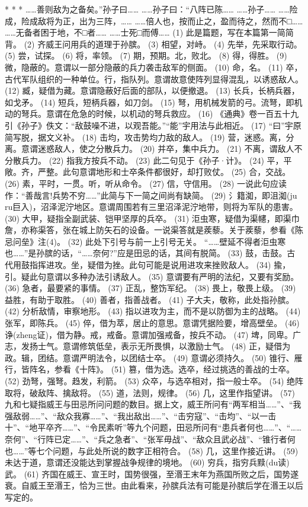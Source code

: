 \documentclass[12pt,UTF8]{ctexbook}
\begin{document}
* * *
……善则敌为之备矣。”孙子曰……
……孙子曰：“八阵已陈……
……孙子……
……险成，险成敌将为正，出为三阵，……
……倍人也，按而止之，盈而待之，然而不□……
……无备者困于地，不□者……
……士死□而傅……
(1) 此是篇题，写在本篇第一简简背。
(2) 齐威王问用兵的道理于孙膑。
(3) 相望，对峙。
(4) 先举，先采取行动。
(5) 尝，试探。
(6) 将，率领。
(7) 期，预期。北，败北。
(8) 得，得胜。
(9) 微，隐蔽的。意谓以一部分隐蔽的兵力袭击敌军的侧面。
(10) 命，名。
(11) 卒，古代军队组织的一种单位。行，指队列。意谓故意使阵列显得混乱，以诱惑敌人。
(12) 臧，疑借为藏。意谓隐蔽好后面的部队，以便撤退。
(13) 长兵，长柄兵器，如戈矛。
(14) 短兵，短柄兵器，如刀剑。
(15) 弩，用机械发箭的弓。流弩，即机动的弩兵。意谓在危急的时候，以机动的弩兵救应。
(16) 《通典》卷一百五十九引《孙子》佚文：“敌鼓噪不进，以观吾能。”“能”宇用法与此相近。
(17) “曰”宇原简写脱，据文义补。
(18) 击均，攻击势均力敌的敌人。
(19) 营，迷惑。离，分离。意谓迷惑敌人，使之分散兵力。
(20) 并卒，集中兵力。
(21) 不离，谓敌人不分散兵力。
(22) 指我方按兵不动。
(23) 此二句见于《孙子·计》。
(24) 平，平敞。齐，严整。此句意谓地形和士卒条件都很好，却打败仗。
(25) 合，交战。
(26) 素，平时，一贯。听，听从命令。
(27) 信，守信用。
(28) 一说此句应读作：“善哉言!兵势不穷……”此简与下一简之间尚有缺简。
(29) {氵籍}洳，即沮洳(ju ru巨入)，沼泽泥泞地区。意谓周围若有三里沼泽泥泞地带，则将为军队的患害。
(30) 大甲，疑指全副武装、铠甲坚厚的兵卒。
(31) {洰虫}寒，疑借为渠幰，即渠{巾詹}，亦称渠答，张在城上防矢石的设备。一说渠答就是蒺藜。关于蒺藜，参看《陈忌问垒》注(4)。
(32) 此处下引号与前一上引号无关。 “……壁延不得者{洰虫}寒也……”是孙膑的话，“……奈何?”应是田忌的话，其间有脱简。
(33) 鼓，击鼓。古代用鼓指挥进攻。坐，疑借为挫。此句可能是说用进攻来挫败敌人。
(34) 揄，引。疑此句意谓以多种办法引诱敌人。
(35) 意谓要有严明的法纪，又要有奖励。
(36) 急者，最要紧的事情。
(37) 正乱，整饬军纪。
(38) 畏上，敬畏上级。
(39) 益胜，有助于取胜。
(40) 善者，指善战者。
(41) 子大夫，敬称，此处指孙膑。
(42) 分析敌情，审察地形。
(43) 指以进攻为主，而不是以防御为主的战略。
(44) 张军，即陈兵。
(45) 倅，借为萃，居止的意思。意谓凭据险要，增高壁垒。
(46) 诤(zheng证)，借为静。戒，戒备。意谓加强戒备，按兵不动。
(47) 埤，同卑。广志，发扬士气。意谓修筑低垒，表示无所畏惧，以激励士气。
(48) 正，疑借为政。辑，团结。意谓严明法令，以团结士卒。
(49) 意谓必须持久。
(50) 锥行、雁行，皆阵名，参看《十阵》。
(51) 篡，借为选。选卒，经过挑选的善战的士卒。
(52) 劲弩，强弩。趋发，利箭。
(53) 众卒，与选卒相对，指一般士卒。
(54) 绝阵取将，破敌阵、擒敌将。
(55) 道，法则，规律。
(56) 几，这里作指望讲。
(57) 九和七疑指威王与田忌所问问题的数目。据上文，威王所问有“两军相当……”、“我强敌弱……”、“敌众我寡……”、“我出敌出……”、“击穷寇”、“击均”、“以一击十”、“地平卒齐……”、“令民素听”等九个问题，田忌所问有“患兵者何也……”、“……奈何”、“行阵已定……”、“兵之急者”、“张军毋战”、“敌众且武必战”、“锥行者何也……”等七个问题，与此处所说的数字正相符合。
(58) 几，这里作接近讲。
(59) 未达于道，意谓还没能达到掌握战争规律的境地。
(60) 穷兵，指穷兵黩(du读)武。
(61) 齐国在威王、宣王时，国势很强，至湣王末年为燕国所败之后，国势遂衰。自威王至湣王，恰为三世。由此看来，孙膑兵法有可能是孙膑后学在湣王以后写定的。
\end{document}
